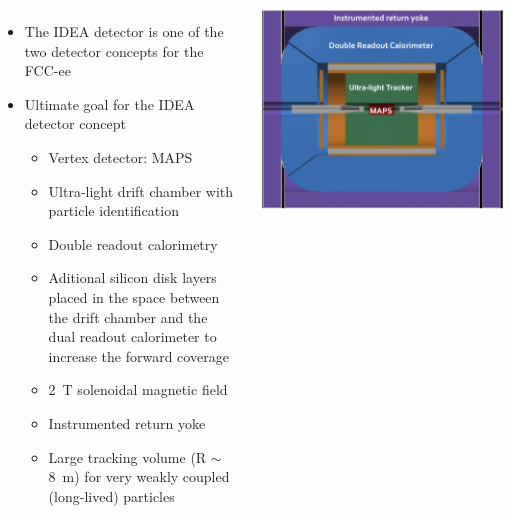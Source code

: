 \documentclass[final,xcolor={dvipsnames,svgnames,x11names,table}]{beamer}
\begin{document}
\begin{frame}
\begin{textblock}{83}
\begin{tcolorbox}[title=The IDEA detector concept for FCC-ee]
  \begin{columns}
      \begin{itemize}
        \item The IDEA detector is one of the two detector concepts for the FCC-ee
        \item Ultimate goal for the IDEA detector concept
          \begin{itemize}
            \item Vertex detector: MAPS
            \item Ultra-light drift chamber with particle identification
            \item Double readout calorimetry
            \item Aditional silicon disk layers placed in the space between the drift chamber and the dual readout calorimeter to increase the forward coverage
            \item 2~T solenoidal magnetic field
            \item Instrumented return yoke
            \item Large tracking volume (R $\sim$ 8~m) for very weakly coupled (long-lived) particles
          \end{itemize}
      \end{itemize}


      \centering
      \includegraphics[width=\textwidth]{../figures/FCCeeIDEAConcept}



\end{columns}
\end{tcolorbox}
\end{textblock}
\end{frame}
\end{document}
